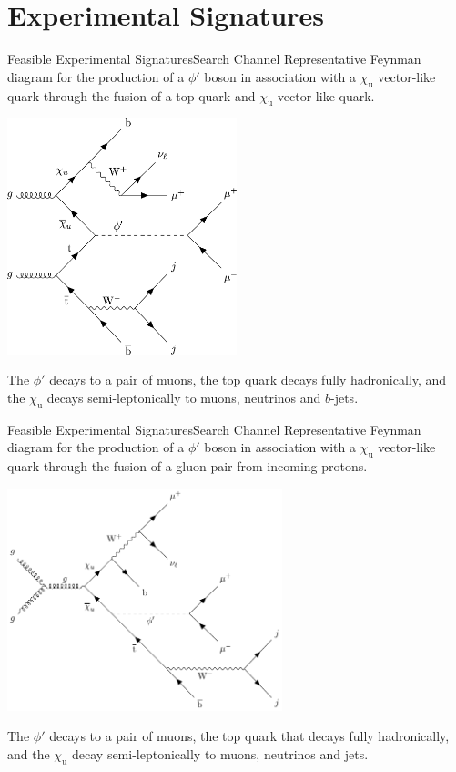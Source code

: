 \documentclass{../bredelebeamer}
\begin{document}
\section{Experimental Signatures}
\begin{frame}{Feasible Experimental Signatures}{Search Channel}
	Representative Feynman diagram for the production of a $\phi'$ boson in association with a $\chi_\mathrm{u}$ vector-like quark through the fusion of a top quark and $\chi_\mathrm{u}$ vector-like quark. 
	\begin{center}
		\includegraphics[width=0.5\textwidth]{main_channel.png}
	\end{center}
	The $\phi'$ decays to a pair of muons, the top quark decays fully hadronically, and the $\chi_\mathrm{u}$ decays semi-leptonically to muons, neutrinos and $b$-jets.
\end{frame}
\begin{frame}{Feasible Experimental Signatures}{Search Channel}
	Representative Feynman diagram for the production of a $\phi'$ boson in association with a $\chi_\mathrm{u}$ vector-like quark through the fusion of a gluon pair from incoming protons.
	\begin{center}
		\includegraphics[width=0.6\textwidth]{signal_ggfusion.pdf}
	\end{center}
	The $\phi'$ decays to a pair of muons, the top quark that decays fully hadronically, and the $\chi_\mathrm{u}$ decay semi-leptonically to muons, neutrinos and jets.
\end{frame}
\end{document}
